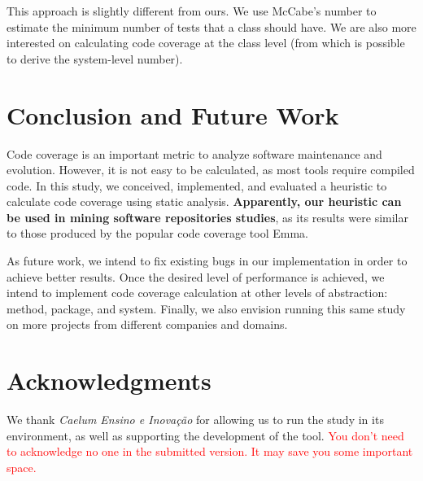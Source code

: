 \documentclass{sig-alternate}
\begin{document}
This approach is slightly different from ours. We use McCabe's number to estimate the
minimum number of tests that a class should have. We are also more interested on calculating
code coverage at the class level (from which is possible to derive the system-level number). 

\section{Conclusion and Future Work}
\label{sec-conclusion}

Code coverage is an important metric to analyze software maintenance and evolution. However, it is 
not easy to be calculated, as most tools require compiled code. In this study, we conceived, implemented, 
and evaluated a heuristic to calculate code coverage using static analysis. 
\textbf{Apparently, our heuristic can be used in mining software repositories studies}, 
as its results were similar to those produced by the popular code coverage tool Emma. 

As future work, we intend to fix existing bugs in our implementation in order to
achieve better results. Once the desired level of performance is achieved, we intend to implement code coverage
calculation at other levels of abstraction: method, package, and system. Finally, we also 
envision running this same study on more projects from different companies and domains.



\section{Acknowledgments}

We thank \textit{Caelum Ensino e Inovação} for allowing us to run the study in its environment,
as well as supporting the development of the tool. \textcolor{red}{You don't need to acknowledge no one in the submitted version. It may save you some important space.}



\end{document}

